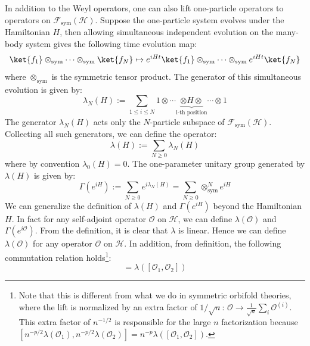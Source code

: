 \documentclass[a4paper,11pt]{article}
\theoremstyle{definition}
\numberwithin{equation}{section}
\begin{document}
In addition to the Weyl operators, one can also lift one-particle operators to operators on $\mathcal{F}_\text{sym}(\mathcal{H})$. Suppose the one-particle system evolves under the Hamiltonian $H$, then allowing simultaneous independent evolution on the many-body system gives the following time evolution map:
\begin{equation}\label{eqution:distribution}
    \ket{f_1}\otimes_\text{sym}\cdots\otimes_\text{sym}\ket{f_N} \mapsto e^{iHt}\ket{f_1}\otimes_\text{sym}\cdots\otimes_\text{sym} e^{iHt}\ket{f_N}
\end{equation}
where $\otimes_\text{sym}$ is the symmetric tensor product. The generator of this simultaneous evolution is given by:
\begin{equation}
    \lambda_N(H) := \sum_{1\leq i\leq N}1\otimes\cdots\underbrace{\otimes H\otimes}_{\text{i-th position}}\cdots\otimes 1
\end{equation}
The generator $\lambda_N(H)$ acts only the $N$-particle subspace of $\mathcal{F}_\text{sym}(\mathcal{H})$. Collecting all such generators, we can define the operator:
\begin{equation}
    \lambda(H) := \sum_{N\geq 0}\lambda_N(H)
\end{equation}
where by convention $\lambda_0(H) = 0$. The one-parameter unitary group generated by $\lambda(H)$ is given by:
\begin{equation}
    \Gamma(e^{iH}) := \sum_{N\geq 0}e^{i\lambda_N(H)} = \sum_{N\geq 0}\otimes_\text{sym}^N e^{iH}
\end{equation}
We can generalize the definition of $\lambda(H)$ and $\Gamma(e^{iH})$ beyond the Hamiltonian $H$. In fact for any self-adjoint operator $\mathcal{O}$ on $\mathcal{H}$, we can define $\lambda(\mathcal{O})$ and $\Gamma(e^{i\mathcal{O}})$. From the definition, it is clear that $\lambda$ is linear. Hence we can define $\lambda(\mathcal{O})$ for any operator $\mathcal{O}$ on $\mathcal{H}$. In addition, from definition, the following commutation relation holds\footnote{Note that this is different from what we do in symmetric orbifold theories, where the lift is normalized by an extra factor of $1/\sqrt{n}$: $\mathcal{O}\to \frac{1}{\sqrt{n}}\sum_i\mathcal{O}^{(i)}$. This extra factor of $n^{-1/2}$ is responsible for the large $n$  factorization because $[n^{-p/2}\lambda(\mathcal{O}_1),n^{-p/2}\lambda(\mathcal{O}_2)]=n^{-p}\lambda([\mathcal{O}_1,\mathcal{O}_2])$.}:
\begin{equation}
    [\lambda(\mathcal{O}_1), \lambda(\mathcal{O}_2)] = \lambda([\mathcal{O}_1, \mathcal{O}_2])
\end{equation}
\end{document}
